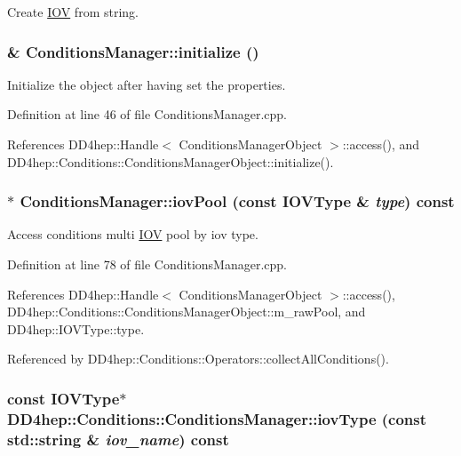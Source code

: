 Create \hyperlink{class_d_d4hep_1_1_i_o_v}{IOV} from string. \hypertarget{class_d_d4hep_1_1_conditions_1_1_conditions_manager_a5908a4b7d16963e26e7bc453eae9bd40}{
\subsubsection[{initialize}]{ \& ConditionsManager::initialize ()}}
\label{class_d_d4hep_1_1_conditions_1_1_conditions_manager_a5908a4b7d16963e26e7bc453eae9bd40}


Initialize the object after having set the properties. 

Definition at line 46 of file ConditionsManager.cpp.

References DD4hep::Handle$<$ ConditionsManagerObject $>$::access(), and DD4hep::Conditions::ConditionsManagerObject::initialize().\hypertarget{class_d_d4hep_1_1_conditions_1_1_conditions_manager_a41334f9fe7baf8250249afcf5b19db20}{
\subsubsection[{iovPool}]{ $\ast$ ConditionsManager::iovPool (const {\bf IOVType} \& {\em type}) const}}
\label{class_d_d4hep_1_1_conditions_1_1_conditions_manager_a41334f9fe7baf8250249afcf5b19db20}


Access conditions multi \hyperlink{class_d_d4hep_1_1_i_o_v}{IOV} pool by iov type. 

Definition at line 78 of file ConditionsManager.cpp.

References DD4hep::Handle$<$ ConditionsManagerObject $>$::access(), DD4hep::Conditions::ConditionsManagerObject::m\_\-rawPool, and DD4hep::IOVType::type.

Referenced by DD4hep::Conditions::Operators::collectAllConditions().\hypertarget{class_d_d4hep_1_1_conditions_1_1_conditions_manager_a1482fa5ace044df693684d705c4e5442}{
\subsubsection[{iovType}]{\setlength{\rightskip}{0pt plus 5cm}const {\bf IOVType}$\ast$ DD4hep::Conditions::ConditionsManager::iovType (const std::string \& {\em iov\_\-name}) const}}
\label{class_d_d4hep_1_1_conditions_1_1_conditions_manager_a1482fa5ace044df693684d705c4e5442}


